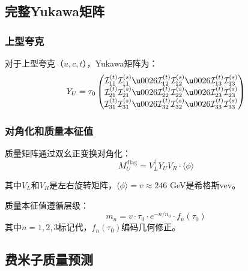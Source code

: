 \subsection{完整Yukawa矩阵}

\subsubsection{上型夸克}

对于上型夸克（$u, c, t$），Yukawa矩阵为：
\begin{equation}
    Y_U = \tau_0 \begin{pmatrix}
        \mathcal{I}_{11}^{(t)} \mathcal{I}_{11}^{(s)} \u0026 \mathcal{I}_{12}^{(t)} \mathcal{I}_{12}^{(s)} \u0026 \mathcal{I}_{13}^{(t)} \mathcal{I}_{13}^{(s)} \\
        \mathcal{I}_{21}^{(t)} \mathcal{I}_{21}^{(s)} \u0026 \mathcal{I}_{22}^{(t)} \mathcal{I}_{22}^{(s)} \u0026 \mathcal{I}_{23}^{(t)} \mathcal{I}_{23}^{(s)} \\
        \mathcal{I}_{31}^{(t)} \mathcal{I}_{31}^{(s)} \u0026 \mathcal{I}_{32}^{(t)} \mathcal{I}_{32}^{(s)} \u0026 \mathcal{I}_{33}^{(t)} \mathcal{I}_{33}^{(s)}
    \end{pmatrix}
\end{equation}

\subsubsection{对角化和质量本征值}

质量矩阵通过双幺正变换对角化：
\begin{equation}
    M_U^{\text{diag}} = V_L^\dagger Y_U V_R \cdot \langle \phi \rangle
\end{equation}

其中$V_L$和$V_R$是左右旋转矩阵，$\langle \phi \rangle = v \approx 246$ GeV是希格斯vev。

\begin{theorem}[质量层级公式]
质量本征值遵循层级：
\begin{equation}
    m_n = v \cdot \tau_0 \cdot e^{-n/n_0} \cdot f_n(\tau_0)
\end{equation}
其中$n = 1, 2, 3$标记代，$f_n(\tau_0)$编码几何修正。
\end{theorem}

\subsection{费米子质量预测}


